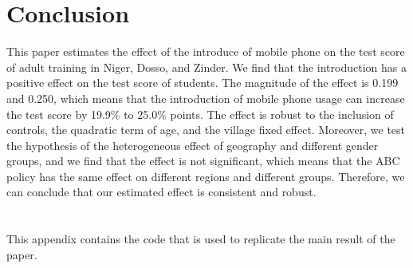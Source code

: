 \documentclass[12pt]{jfm}
\begin{document}
\section{Conclusion} \label{sec:conclusion}

This paper estimates the effect of the introduce of mobile phone on the test score of adult training in Niger, Dosso, and Zinder. We find that the introduction has a positive effect on the test score of students. The magnitude of the effect is 0.199 and 0.250, which means that the introduction of mobile phone usage can increase the test score by 19.9\% to 25.0\% points. The effect is robust to the inclusion of controls, the quadratic term of age, and the village fixed effect. Moreover, we test the hypothesis of the heterogeneous effect of geography and different gender groups, and we find that the effect is not significant, which means that the ABC policy has the same effect on different regions and different groups. Therefore, we can conclude that our estimated effect is consistent and robust.





\newpage

\appendix

\section{}\label{appA}

This appendix contains the code that is used to replicate the main result of the paper.

%   





\end{document}
